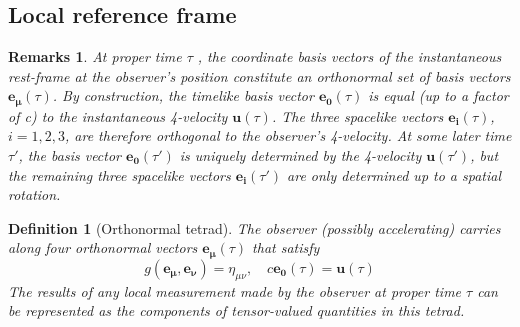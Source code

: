 \documentclass[a4paper]{article}
\newtheorem{remarks}{Remarks}[section]
\theoremstyle{new}
\newtheorem{defi}{Definition}[section]
\begin{document}
\subsection{Local reference frame}
\begin{remarks}
At proper time $\tau$ , the coordinate basis vectors of the instantaneous rest-frame at the observer’s position constitute an orthonormal set of basis vectors $\mathbf{e_\mu}(\tau)$. By construction, the timelike basis vector $\mathbf{e_0}(\tau)$ is equal (up to a factor of c) to the instantaneous 4-velocity $\mathbf{u}(\tau)$. The three spacelike vectors $\mathbf{e_i}(\tau)$, $i = 1, 2, 3$, are therefore orthogonal to the observer’s 4-velocity. At some later time $\tau'$, the basis vector $\mathbf{e_0}(\tau')$ is uniquely determined by the 4-velocity $\mathbf{u}(\tau')$, but the remaining three spacelike vectors $\mathbf{e_i}(\tau')$ are only determined up to a spatial rotation.
\end{remarks}
\begin{defi}[Orthonormal tetrad]
The observer (possibly accelerating) carries along four orthonormal vectors $\mathbf{e_\mu}(\tau)$ that satisfy
$$g(\mathbf{e_\mu},\mathbf{e_\nu})=\eta_{\mu\nu},\quad c\mathbf{e_0}(\tau)=\mathbf{u}(\tau)$$
The results of any local measurement made by the observer at proper time $\tau$ can be represented as the components of tensor-valued quantities in this tetrad.
\end{defi}
\end{document}
